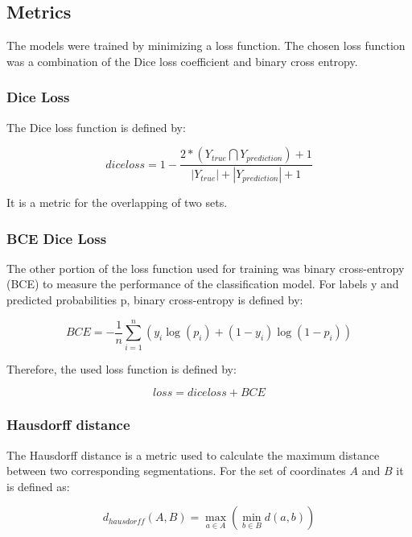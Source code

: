\subsection{Metrics}\label{metrics_chapter}

The models were trained by minimizing a loss function. The chosen loss function was a combination of the Dice loss coefficient and binary cross entropy. 

\subsubsection{Dice Loss}
The Dice loss function is defined by:

\begin{equation}
dice loss = 1 - \frac{2*(Y_{true} \bigcap Y_{prediction}) + 1}{|Y_{true}| + |Y_{prediction}| + 1}
\end{equation} 

It is a metric for the overlapping of two sets.

\subsubsection{BCE Dice Loss}
The other portion of the loss function used for training was binary cross-entropy (BCE) to measure the performance of the classification model. For labels y and predicted probabilities p, binary cross-entropy is defined by:

\begin{equation}
BCE = - \frac{1}{n} \sum_{i=1}^{n}(y_i \log{(p_i)} + (1-y_i)\log{(1-p_i)})
\end{equation} 

Therefore, the used loss function is defined by:

\begin{equation}
loss =  dice loss + BCE
\end{equation}

\subsubsection{Hausdorff distance}
The Hausdorff distance is a metric used to calculate the maximum distance between two corresponding segmentations.\newline
For the set of coordinates $A$ and $B$ it is defined as:

\begin{equation}
	d_{hausdorff} (A,B) = \max_{a \in A} (\min_{b \in B} d(a,b))
\end{equation} 

